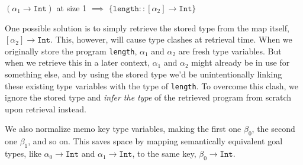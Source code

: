 \documentclass[acmsmall,nonacm]{acmart}
\begin{document}
\begin{center}
  $(\alpha_1 \to \texttt{Int})$ at size 1 $\implies$
$\big\{\texttt{length} :: [\alpha_2] \to \texttt{Int}\big\}$
\end{center}

One possible solution is to simply retrieve the stored type from the map itself, 
$[\alpha_2] \to \texttt{Int}$.
This, however, will cause type clashes at retrieval time. When we originally store the program 
\texttt{length}, $\alpha_1$ and $\alpha_2$ are fresh type variables. But when we 
retrieve this in a later context, $\alpha_1$ and $\alpha_2$ might already be in use for 
something else, and by using the stored type we'd be unintentionally linking these existing 
type variables with the type of \texttt{length}.
To overcome this clash, we ignore the stored type and \textit{infer the type} of the retrieved 
program from scratch upon retrieval instead. 

We also normalize memo key type variables, making the first one 
$\beta_0$, the second one $\beta_1$, and so on. This saves space by mapping semantically 
equivalent goal types, like $\alpha_0 \to \texttt{Int}$ and $\alpha_1 \to \texttt{Int}$, 
to the same key, $\beta_0 \to \texttt{Int}$.





\end{document}
